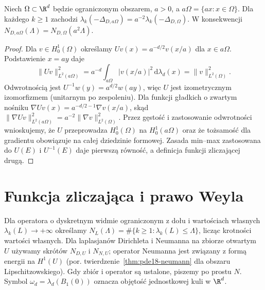 \begin{stwierdzenie}
\label{prop:pde18-scale}
Niech $\Omega\subset\R^d$ będzie ograniczonym obszarem,
$a>0$, a $a\Omega=\{ax:x\in\Omega\}$.
Dla każdego $k\ge1$ zachodzi
$\lambda_k(-\Delta_{D,a\Omega})=a^{-2}\lambda_k(-\Delta_{D,\Omega})$.
W konsekwencji
$N_{D,a\Omega}(\Lambda)=N_{D,\Omega}(a^2\Lambda)$.
\end{stwierdzenie}
\begin{proof}
Dla $v\in H_0^1(\Omega)$ określamy
$Uv(x)=a^{-d/2}v(x/a)$ dla $x\in a\Omega$.
Podstawienie $x=ay$ daje
\[
 \|Uv\|_{L^2(a\Omega)}^2
 =a^{-d}\int_{a\Omega}|v(x/a)|^2\,\mathrm d\lambda_d(x)
 =\|v\|_{L^2(\Omega)}^2.
\]
Odwrotnością jest $U^{-1}w(y)=a^{d/2}w(ay)$,
więc $U$ jest izometrycznym izomorfizmem (unitarnym
po zespoleniu). Dla funkcji gładkich o zwartym nośniku
$\nabla Uv(x)=a^{-d/2-1}\nabla v(x/a)$, skąd
$\|\nabla Uv\|_{L^2(a\Omega)}^2
=a^{-2}\|\nabla v\|_{L^2(\Omega)}^2$.
Przez gęstość i zastosowanie odwrotności wnioskujemy,
że $U$ przeprowadza $H_0^1(\Omega)$ na $H_0^1(a\Omega)$
oraz że tożsamość dla gradientu obowiązuje na całej
dziedzinie formowej.
Zasada min--max zastosowana do $U(E)$ i $U^{-1}(E)$
daje pierwszą równość, a definicja funkcji zliczającej drugą.
\end{proof}

\section{Funkcja zliczająca i prawo Weyla}
\label{sec:pde18-weyl}
\begin{definicja}
Dla operatora o dyskretnym widmie ograniczonym z dołu
i wartościach własnych $\lambda_k(L)\to+\infty$ określamy
$N_L(\Lambda)=\#\{k\ge1:\lambda_k(L)\le\Lambda\}$,
licząc krotności wartości własnych. Dla laplasjanów
Dirichleta i Neumanna na zbiorze otwartym $U$ używamy
skrótów $N_{D,U}$ i $N_{N,U}$; operator Neumanna
jest związany z formą energii na $H^1(U)$ (por.
twierdzenie~\ref{thm:pde18-neumann} dla obszaru Lipschitzowskiego).
Gdy zbiór i operator są ustalone, piszemy po prostu $N$.
Symbol $\omega_d=\lambda_d(B_1(0))$ oznacza objętość
jednostkowej kuli w $\R^d$.
\end{definicja}

